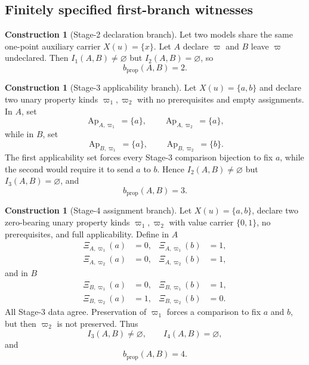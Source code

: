 \documentclass[11pt]{article}
\newcommand{\Ap}{\operatorname{Ap}}
\theoremstyle{definition}
\newtheorem{construction}[theorem]{Construction}
\theoremstyle{remark}
\begin{document}
\subsection{Finitely specified first-branch witnesses}

\begin{construction}[Stage-2 declaration branch]
Let two models share the same one-point auxiliary carrier \(X(u)=\{x\}\).
Let \(A\) declare \(\varpi\) and \(B\) leave \(\varpi\) undeclared.
Then \(I_1(A,B)\neq\varnothing\) but \(I_2(A,B)=\varnothing\), so
\[
b_{\mathrm{prop}}(A,B)=2.
\]
\end{construction}

\begin{construction}[Stage-3 applicability branch]
Let \(X(u)=\{a,b\}\) and declare two unary property kinds \(\varpi_1,\varpi_2\) with no prerequisites and empty assignments.
In \(A\), set
\[
\Ap_{A,\varpi_1}=\{a\},
\qquad
\Ap_{A,\varpi_2}=\{a\},
\]
while in \(B\), set
\[
\Ap_{B,\varpi_1}=\{a\},
\qquad
\Ap_{B,\varpi_2}=\{b\}.
\]
The first applicability set forces every Stage-3 comparison bijection to fix \(a\), while the second would require it to send \(a\) to \(b\).
Hence \(I_2(A,B)\neq\varnothing\) but \(I_3(A,B)=\varnothing\), and
\[
b_{\mathrm{prop}}(A,B)=3.
\]
\end{construction}

\begin{construction}[Stage-4 assignment branch]
Let \(X(u)=\{a,b\}\), declare two zero-bearing unary property kinds \(\varpi_1,\varpi_2\) with value carrier \(\{0,1\}\), no prerequisites, and full applicability.
Define in \(A\)
\[
\begin{aligned}
\Xi_{A,\varpi_1}(a)&=0,&\Xi_{A,\varpi_1}(b)&=1,\\
\Xi_{A,\varpi_2}(a)&=0,&\Xi_{A,\varpi_2}(b)&=1,
\end{aligned}
\]
and in \(B\)
\[
\begin{aligned}
\Xi_{B,\varpi_1}(a)&=0,&\Xi_{B,\varpi_1}(b)&=1,\\
\Xi_{B,\varpi_2}(a)&=1,&\Xi_{B,\varpi_2}(b)&=0.
\end{aligned}
\]
All Stage-3 data agree.
Preservation of \(\varpi_1\) forces a comparison to fix \(a\) and \(b\), but then \(\varpi_2\) is not preserved.
Thus
\[
I_3(A,B)\neq\varnothing,
\qquad
I_4(A,B)=\varnothing,
\]
and
\[
b_{\mathrm{prop}}(A,B)=4.
\]
\end{construction}
\end{document}

